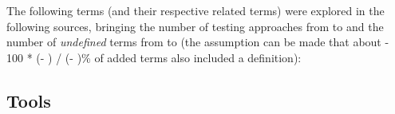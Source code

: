 The following terms (and their respective related terms) were explored%
\ifnotpaper in the following sources\fi, bringing the number of testing
approaches from \the\TotalBefore{} to \the\TotalAfter{} and the number of
\emph{undefined} terms from \the\UndefBefore{} to \the\UndefAfter{} (the
assumption can be made that about \the{} - 100 * (\UndefAfter -
\UndefBefore) / (\TotalAfter - \TotalBefore)\relax\% of added terms also
included a definition):



\ifnotpaper\else
    \ieeeTestTermsTable{}  %
    \subsection{Tools}  %
    \graphGenDesc{}
\fi
